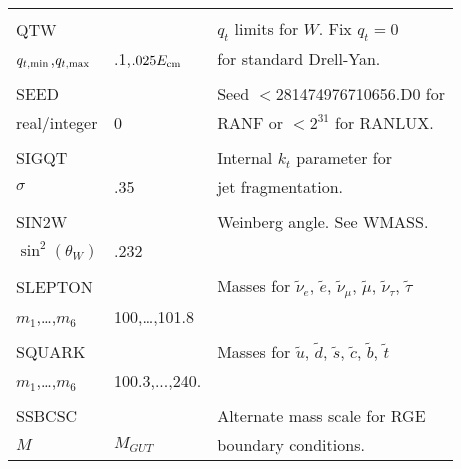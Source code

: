 \begin{center}
\begin{tabular}{lll}
                       &                   &                                \\
QTW                    &                   & $q_t$ limits for $W$. Fix 
$q_t=0$                                                                     \\
$q_{t,{\rm min}}$,$q_{t,{\rm max}}$ & 
.1,$.025E_{\rm cm}$                        & for standard Drell-Yan.        \\
                       &                   &                                \\
SEED                   &                   & Seed $<$281474976710656.D0 for \\
real/integer           & 0                 & RANF or $<$$2^{31}$ for RANLUX.\\
                       &                   &                                \\
SIGQT                  &                   & Internal $k_t$ parameter for   \\
$\sigma$               & .35               & jet fragmentation.             \\
                       &                   &                                \\
SIN2W                  &                   & Weinberg angle. See WMASS.     \\
$\sin^2(\theta_W)$     & .232              &                                \\
                       &                   &                                \\
SLEPTON                &                   & Masses for $\tilde \nu_e$,
$\tilde e$, $\tilde\nu_\mu$, $\tilde\mu$, $\tilde\nu_\tau$, $\tilde\tau$    \\
$m_1$,\dots,$m_6$      & 100,\dots,101.8   &                                \\
                       &                   &                                \\
SQUARK                 &                   & Masses for $\tilde u$,
$\tilde d$, $\tilde s$, $\tilde c$, $\tilde b$, $\tilde t$                  \\
$m_1$,\dots,$m_6$      & 100.3,...,240.    &                                \\
                       &                   &                                \\
SSBCSC                 &                   & Alternate mass scale for RGE   \\
$M$                    & $M_{GUT}$         & boundary conditions.           \\
\hline\hline
\end{tabular}
\end{center}

